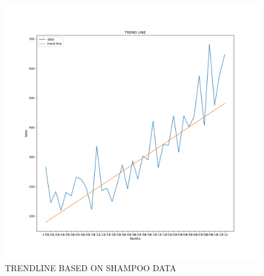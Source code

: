 \documentclass[12pt, letterpaper, twoside]{article}
\begin{document}
\begin{figure}[bp!]                                                                                                                                                                 \centering                                                                                                                                                                  \includegraphics[width=1\textwidth]{SHAMPOO_DATA_Trendline.png}
	                    \caption{TRENDLINE BASED ON SHAMPOO DATA}
			                            \label{fig:2.3}
\end{figure}
\end{document}
